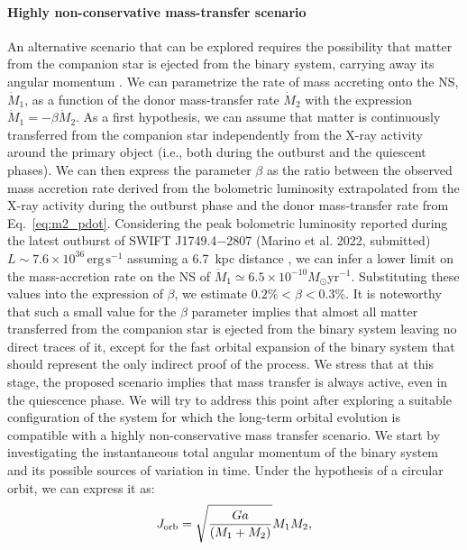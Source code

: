 \documentclass[fleqn,usenatbib]{mnras}
\newcommand{\swiftj}{SWIFT J1749.4$-$2807}
\begin{document}
\paragraph{Highly non-conservative mass-transfer scenario}
An alternative scenario that can be explored requires the possibility that matter from the companion star is ejected from the binary system, carrying away its angular momentum \citep[see e.g.,][for more details]{di-Salvo:2008uu,Burderi:2009td}. We can parametrize the rate of mass accreting onto the NS, $\dot{M}_1$, as a function of the donor mass-transfer rate $\dot{M}_2$ with the expression $\dot{M}_1=-\beta \dot{M}_2$. As a first hypothesis, we can assume that matter is continuously transferred from the companion star independently from the X-ray activity around the primary object (i.e., both during the outburst and the quiescent phases). We can then express the parameter $\beta$ as the ratio between the observed mass accretion rate derived from the bolometric luminosity extrapolated from the X-ray activity during the outburst phase and the donor mass-transfer rate from Eq.~\ref{eq:m2_pdot}. Considering the peak bolometric luminosity reported during the latest outburst of \swiftj{} (Marino et al. 2022, submitted) $L\sim7.6\times 10^{36}\,\text{erg}\,\text{s}^{-1}$ assuming a 6.7~kpc distance \citep{Wijnands:2009wa}, we can infer a lower limit on the mass-accretion rate on the NS of $\dot{M}_1\simeq6.5\times 10^{-10}{M}_{\odot} \text{yr}^{-1}$. Substituting these values into the expression of $\beta$, we estimate $0.2\%<\beta<0.3\%$. It is noteworthy that such a small value for the $\beta$ parameter implies that almost all matter transferred from the companion star is ejected from the binary system leaving no direct traces of it, except for the fast orbital expansion of the binary system that should represent the only indirect proof of the process. We stress that at this stage, the proposed scenario implies that mass transfer is always active, even in the quiescence phase. We will try to address this point after exploring a suitable configuration of the system  for which the long-term orbital evolution is compatible with a highly non-conservative mass transfer scenario. 
We start by investigating the instantaneous total angular momentum of the binary system and its possible sources of variation in time. Under the hypothesis of a circular orbit, we can express it as:
\begin{equation}
\label{eq:binarymoment}
J_{\rm orb}=\sqrt{\frac{Ga}{(M_1+M_2)}}M_1M_2,
\end{equation}
\end{document}
